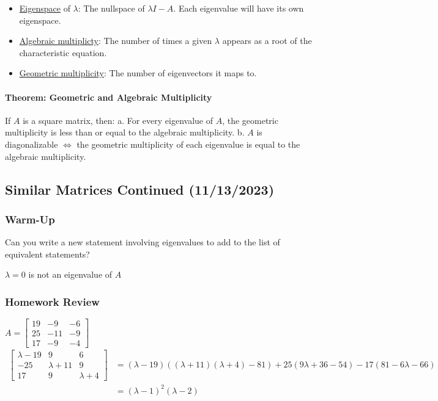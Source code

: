 \documentclass[
  letterpaper,
  DIV=11,
  numbers=noendperiod]{scrartcl}
\let\oldparagraph\paragraph
\renewcommand{\paragraph}[1]{\oldparagraph{#1}\mbox{}}
\providecommand{\tightlist}{%
  \setlength{\itemsep}{0pt}\setlength{\parskip}{0pt}}\usepackage{longtable,booktabs,array}
\begin{document}
\begin{itemize}
\tightlist
\item
  \ul{Eigenspace} of \(\lambda\): The nullspace of \(\lambda I - A\).
  Each eigenvalue will have its own eigenspace.
\item
  \ul{Algebraic multiplicty}: The number of times a given \(\lambda\)
  appears as a root of the characteristic equation.
\item
  \ul{Geometric multiplicity}: The number of eigenvectors it maps to.
\end{itemize}

\paragraph{Theorem: Geometric and Algebraic
Multiplicity}\label{theorem-geometric-and-algebraic-multiplicity}

If \(A\) is a square matrix, then: a. For every eigenvalue of \(A\), the
geometric multiplicity is less than or equal to the algebraic
multiplicity. b. \(A\) is diagonalizable \(\iff\) the geometric
multiplicity of each eigenvalue is equal to the algebraic multiplicity.

\subsection{Similar Matrices Continued
(11/13/2023)}\label{similar-matrices-continued-11132023}

\subsubsection{Warm-Up}\label{warm-up}

Can you write a new statement involving eigenvalues to add to the list
of equivalent statements?

\(\lambda = 0\) is not an eigenvalue of \(A\)

\subsubsection{Homework Review}\label{homework-review}

\(A = \begin{bmatrix} 19 & -9 & -6 \\ 25 & -11 & -9 \\ 17 & -9 & -4 \end{bmatrix}\)
\begin{align*}
\begin{bmatrix}\lambda-19 & 9 & 6 \\ -25 & \lambda+11 & 9 \\ 17 & 9 & \lambda + 4\end{bmatrix}
&= (\lambda-19)((\lambda+11)(\lambda+4)-81) + 25(9\lambda+36-54) - 17(81-6\lambda-66) \\
&= (\lambda-1)^2(\lambda-2)
\end{align*}
\end{document}
